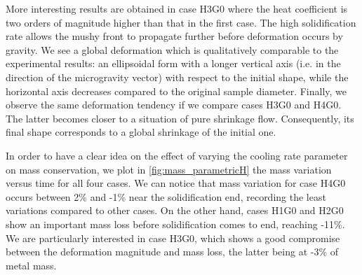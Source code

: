 More interesting results are obtained in case H3G0 where the heat coefficient is two orders of magnitude 
higher than that in the first case. The high solidification rate allows the mushy front 
to propagate further before deformation occurs by gravity. We see a global deformation which is qualitatively comparable to the experimental 
results: an ellipsoidal form with a longer vertical axis (i.e. in the direction of the microgravity vector) 
with respect to the initial shape, while the horizontal axis decreases compared to the original
sample diameter. Finally, we observe the same deformation tendency if we compare cases H3G0 and H4G0. 
The latter becomes closer to a situation of pure shrinkage flow. 
Consequently, its final shape corresponds to a global shrinkage of the initial one.

In order to have a clear idea on the effect of varying the cooling rate parameter on mass conservation, we plot in \cref{fig:mass_parametricH}
the mass variation versus time for all four cases. We can notice that mass variation for case H4G0 occurs between 2\% and -1\% near the solidification end,
recording the least variations compared to other cases. On the other hand, cases H1G0 and H2G0 show an important mass loss before solidification comes to end,
reaching -11\%. We are particularly interested in case H3G0, which shows a good compromise between the deformation magnitude and mass loss, the latter being at -3\% of metal mass.


